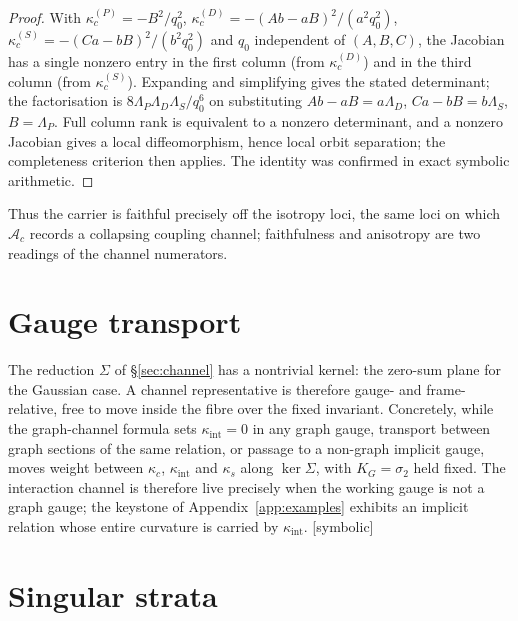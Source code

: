 \documentclass[11pt]{article}
\newcommand{\Symbolic}{\textsf{[symbolic]}}
\theoremstyle{plain}
\theoremstyle{definition}
\newcommand{\KG}{K_{G}}
\newcommand{\Ac}{\mathcal{A}_c}
\newcommand{\kc}{\kappa_{c}}
\newcommand{\kint}{\kappa_{\mathrm{int}}}
\newcommand{\ks}{\kappa_{s}}
\newcommand{\kcrole}[1]{\kappa_{c}^{(#1)}}   %
\begin{document}
\begin{proof}
With $\kcrole{P}=-B^2/q_0^2$, $\kcrole{D}=-(Ab-aB)^2/(a^2q_0^2)$,
$\kcrole{S}=-(Ca-bB)^2/(b^2q_0^2)$ and $q_0$ independent of $(A,B,C)$, the Jacobian has a single
nonzero entry in the first column (from $\kcrole{D}$) and in the third column (from $\kcrole{S}$).
Expanding and simplifying gives the stated determinant; the factorisation is
$8\Lambda_P\Lambda_D\Lambda_S/q_0^6$ on substituting $Ab-aB=a\Lambda_D$, $Ca-bB=b\Lambda_S$,
$B=\Lambda_P$. Full column rank is equivalent to a nonzero determinant, and a nonzero Jacobian gives a
local diffeomorphism, hence local orbit separation; the completeness criterion then applies. The
identity was confirmed in exact symbolic arithmetic.
\end{proof}

Thus the carrier is faithful precisely off the isotropy loci, the same loci on which $\Ac$ records a
collapsing coupling channel; faithfulness and anisotropy are two readings of the channel numerators.

\section{Gauge transport}
\label{sec:transport}

The reduction $\Sigma$ of \S\ref{sec:channel} has a nontrivial kernel: the zero-sum plane for the
Gaussian case. A channel representative is therefore gauge- and frame-relative, free to move inside
the fibre over the fixed invariant. Concretely, while the graph-channel formula sets $\kint=0$ in any
graph gauge, transport between graph sections of the same relation, or passage to a non-graph
implicit gauge, moves weight between $\kc$, $\kint$ and $\ks$ along $\ker\Sigma$, with $\KG=\sigma_2$
held fixed. The interaction channel is therefore live precisely when the working gauge is not a graph
gauge; the keystone of Appendix~\ref{app:examples} exhibits an implicit relation whose entire
curvature is carried by $\kint$. \Symbolic

\section{Singular strata}
\label{sec:singular}
\end{document}
